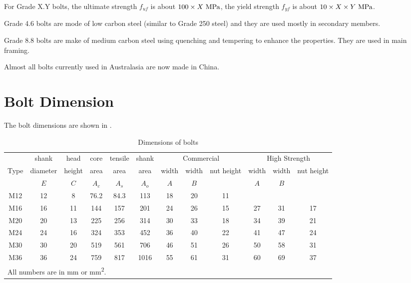 For Grade X.Y bolts, the ultimate strength $f_{uf}$ is about $100\times{}X~\si{\mega\pascal}$, the yield strength $f_{yf}$ is about $10\times{}X\times{}Y~\si{\mega\pascal}$.

Grade 4.6 bolts are mode of low carbon steel (similar to Grade 250 steel) and they are used mostly in secondary members.

Grade 8.8 bolts are make of medium carbon steel using quenching and tempering to enhance the properties. They are used in main framing.

Almost all bolts currently used in Australasia are now made in China.
\section{Bolt Dimension}
The bolt dimensions are shown in .
\begin{table}[H]
\centering\footnotesize\caption{Dimensions of bolts}\label{tab:bolt_dim}
\begin{tabular}{c|cc|ccc|ccc|ccc}
	\toprule
	     &  shank   &  head  & core  & tensile & shank & \multicolumn{3}{c|}{Commercial} & \multicolumn{3}{c}{High Strength} \\
	Type & diameter & height & area  &  area   & area  & width & width &   nut height    & width & width &    nut height     \\
	     &   $E$    &  $C$   & $A_c$ &  $A_s$  & $A_o$ &  $A$  &  $B$  &                 &  $A$  &  $B$  &                   \\ \midrule
	M12  &    12    &   8    & 76.2  &  84.3   &  113  &  18   &  20   &       11        &       &       &                   \\
	M16  &    16    &   11   &  144  &   157   &  201  &  24   &  26   &       15        &  27   &  31   &        17         \\
	M20  &    20    &   13   &  225  &   256   &  314  &  30   &  33   &       18        &  34   &  39   &        21         \\
	M24  &    24    &   16   &  324  &   353   &  452  &  36   &  40   &       22        &  41   &  47   &        24         \\
	M30  &    30    &   20   &  519  &   561   &  706  &  46   &  51   &       26        &  50   &  58   &        31         \\
	M36  &    36    &   24   &  759  &   817   & 1016  &  55   &  61   &       31        &  60   &  69   &        37         \\ \bottomrule
	\multicolumn{12}{l}{All numbers are in \si{\mm} or \si{\mm^2}.}
\end{tabular}
\end{table}
